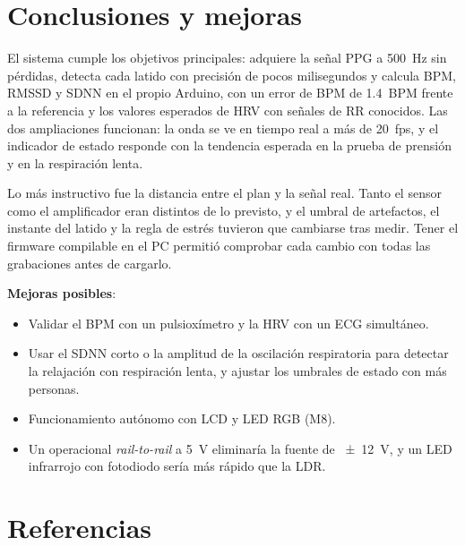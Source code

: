 \documentclass[11pt,a4paper]{article}
\begin{document}
\section{Conclusiones y mejoras}

El sistema cumple los objetivos principales: adquiere la señal PPG a \qty{500}{Hz} sin
pérdidas, detecta cada latido con precisión de pocos milisegundos y calcula BPM, RMSSD y SDNN
en el propio Arduino, con un error de BPM de \qty{1.4}{BPM} frente a la referencia y los
valores esperados de HRV con señales de RR conocidos. Las dos ampliaciones funcionan: la onda
se ve en tiempo real a más de \qty{20}{fps}, y el indicador de estado responde con la
tendencia esperada en la prueba de prensión y en la respiración lenta.

Lo más instructivo fue la distancia entre el plan y la señal real. Tanto el sensor como el
amplificador eran distintos de lo previsto, y el umbral de artefactos, el instante del
latido y la regla de estrés tuvieron que cambiarse tras medir. Tener el firmware compilable en
el PC permitió comprobar cada cambio con todas las grabaciones antes de cargarlo.

\textbf{Mejoras posibles}:
\begin{itemize}[leftmargin=1.2em,itemsep=2pt,topsep=2pt]
  \item Validar el BPM con un pulsioxímetro y la HRV con un ECG simultáneo.
  \item Usar el SDNN corto o la amplitud de la oscilación respiratoria para detectar la
        relajación con respiración lenta, y ajustar los umbrales de estado con más personas.
  \item Funcionamiento autónomo con LCD y LED RGB (M8).
  \item Un operacional \emph{rail-to-rail} a \qty{5}{V} eliminaría la fuente de
        \qty{\pm 12}{V}, y un LED infrarrojo con fotodiodo sería más rápido que la LDR.
\end{itemize}

\section*{Referencias}
\end{document}
